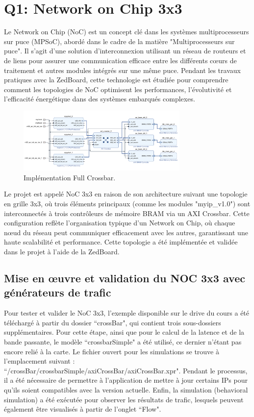 \documentclass[../CSC_5RO07_TA.tex]{subfiles}
\begin{document}
\section{Q1: Network on Chip 3x3}

Le Network on Chip (NoC) est un concept clé dans les systèmes multiprocesseurs sur puce (MPSoC), abordé dans le cadre de la matière "Multiprocesseurs sur puce". Il s'agit d'une solution d'interconnexion utilisant un réseau de routeurs et de liens pour assurer une communication efficace entre les différents cœurs de traitement et autres modules intégrés sur une même puce. Pendant les travaux pratiques avec la ZedBoard, cette technologie est étudiée pour comprendre comment les topologies de NoC optimisent les performances, l'évolutivité et l'efficacité énergétique dans des systèmes embarqués complexes.

\begin{figure}[H]
    \centering
    \includegraphics[width=0.75\textwidth]{./images/Q1-1.png}
    \caption{Implémentation Full Crossbar.}
\end{figure}

Le projet est appelé NoC 3x3 en raison de son architecture suivant une topologie en grille 3x3, où trois éléments principaux (comme les modules "myip\_v1.0") sont interconnectés à trois contrôleurs de mémoire BRAM via un AXI Crossbar. Cette configuration reflète l’organisation typique d’un Network on Chip, où chaque nœud du réseau peut communiquer efficacement avec les autres, garantissant une haute scalabilité et performance. Cette topologie a été implémentée et validée dans le projet à l’aide de la ZedBoard.

\subsection{Mise en œuvre et validation du NOC 3x3 avec générateurs de trafic}

Pour tester et valider le NoC 3x3, l’exemple disponible sur le drive du cours a été téléchargé à partir du dossier ``crossBar", qui contient trois sous-dossiers supplémentaires. Pour cette étape, ainsi que pour le calcul de la latence et de la bande passante, le modèle ``crossbarSimple" a été utilisé, ce dernier n'étant pas encore relié à la carte. Le fichier ouvert pour les simulations se trouve à l'emplacement suivant : ``/crossBar/crossbarSimple/axiCrossBar/axiCrossBar.xpr". Pendant le processus, il a été nécessaire de permettre à l'application de mettre à jour certains IPs pour qu'ils soient compatibles avec la version actuelle. Enfin, la simulation (behavioral simulation) a été exécutée pour observer les résultats de trafic, lesquels peuvent également être visualisés à partir de l’onglet ``Flow".
\end{document}
